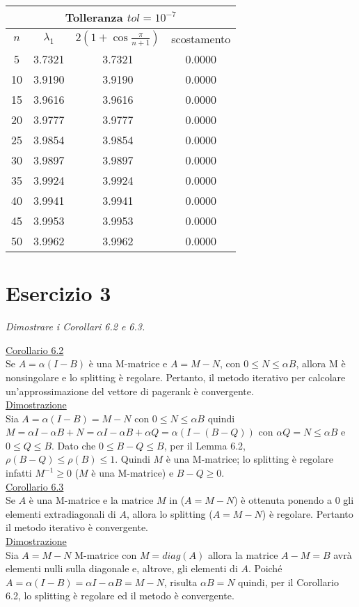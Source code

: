 \begin{sol}
  \begin{center}\begin{tabular}{c|c|c|c}
    \hline\multicolumn{4}{c}{Tolleranza $tol=10^{-7}$}\\\hline
    $n$ & $\lambda_1$ & $2\left(1+\cos{\frac{\pi}{n+1}}\right)$ & scostamento\\\hline
    5 & 3.7321 & 3.7321 & 0.0000 \\
    10 & 3.9190 & 3.9190 & 0.0000 \\
    15 & 3.9616 & 3.9616 & 0.0000 \\
    20 & 3.9777 & 3.9777 & 0.0000 \\
    25 & 3.9854 & 3.9854 & 0.0000 \\
    30 & 3.9897 & 3.9897 & 0.0000 \\
    35 & 3.9924 & 3.9924 & 0.0000 \\
    40 & 3.9941 & 3.9941 & 0.0000 \\
    45 & 3.9953 & 3.9953 & 0.0000 \\
    50 & 3.9962 & 3.9962 & 0.0000
  \end{tabular}\end{center}
\end{sol}


\section{Esercizio 3}
\label{sub:es3}
\emph{Dimostrare i Corollari 6.2 e 6.3.}
\begin{sol}
  \normalfont
  \underline{Corollario 6.2}\\
  Se $A=\alpha(I-B)$ è una M-matrice e $A=M-N$, con $0\leq N\leq\alpha B$, allora M è nonsingolare
  e lo splitting è regolare. Pertanto, il metodo iterativo per calcolare un’approssimazione
  del vettore di pagerank è convergente.
  \\
  \underline{Dimostrazione}\\
  Sia $A=\alpha(I-B)=M-N$ con $0\leq N\leq\alpha B$ quindi $M=\alpha I-\alpha B+N=\alpha I-\alpha B+\alpha Q=\alpha(I-(B-Q))$
  con $\alpha Q=N\leq\alpha B$ e $0\leq Q\leq B$. Dato che $0\leq B-Q\leq B$, per il Lemma 6.2,
  $\rho(B-Q)\leq\rho(B)\leq 1$. Quindi $M$ è una M-matrice; lo splitting è regolare infatti
  $M^{-1}\geq 0$ ($M$ è una M-matrice) e $B-Q\geq 0$.\\
  \vspace{5mm}
  \underline{Corollario 6.3}\\
  Se $A$ è una M-matrice e la matrice $M$ in ($A=M-N$) è ottenuta ponendo a $0$
  gli elementi extradiagonali di $A$, allora lo splitting ($A=M-N$) è regolare.
  Pertanto il metodo iterativo è convergente.\\
  \underline{Dimostrazione}\\
  Sia $A=M-N$ M-matrice con $M=diag(A)$ allora la matrice $A-M=B$ avrà elementi nulli sulla diagonale e, altrove,
  gli elementi di $A$. Poiché $A=\alpha(I-B)=\alpha I-\alpha B=M-N$, risulta $\alpha B=N$ quindi,
  per il Corollario 6.2, lo splitting è regolare ed il metodo è convergente.
\end{sol}

